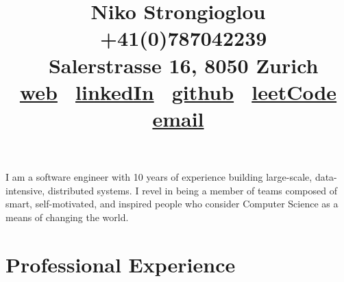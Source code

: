 \documentclass{article}
\begin{document}
	\title{ \raggedright
            \Huge{\vspace{-3.5cm} \color{NavyBlue}Niko Strongioglou } \\ \small{
			\faPhone \, +41(0)787042239 \\
			\faMapMarker \, Salerstrasse 16, 8050 Zurich \\
                \faGlobe \, \href{http://tonyflow.github.io/}{web} \quad
                \faLinkedin \, \href{https://www.linkedin.com/in/nikolaos-strongioglou/}{linkedIn} \quad
                \faGithub \, \href{https://github.com/tonyflow}{github} \quad
                \faUserSecret \, \href{https://leetcode.com/nikostr/}{leetCode} \quad
                \faEnvelope \, \href{mailto:nikos.strongioglou@gmail.com}{email}
		}
        }
	\author{}
	\date{}
	\maketitle
	
	\vspace{-1.4cm}
	\noindent
	I am a software engineer with 10 years of experience building large-scale, data-intensive, distributed systems. I revel in being a member of teams composed of smart, self-motivated, and inspired people who consider Computer Science as a means of changing the world.


	\section*{\color{NavyBlue}Professional Experience}
	\vspace{-0.5cm}	
	{\color{NavyBlue}\hrulefill}
	
\end{document}
